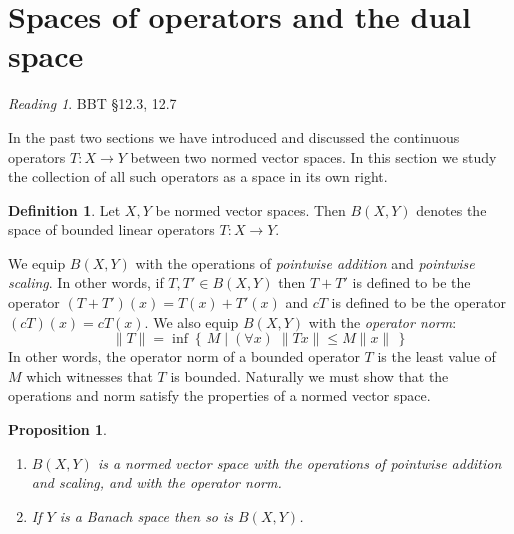 \documentclass[11pt,oneside]{amsbook}
\newcommand{\set}[1]{\left\{\,#1\,\right\}}
\theoremstyle{definition}
\theoremstyle{plain}
\newtheorem{prop}[thm]{Proposition}
\theoremstyle{definition}
\newtheorem{defn}[thm]{Definition}
\theoremstyle{remark}
\newtheorem*{reading}{Reading}
\numberwithin{equation}{section}
\numberwithin{figure}{section}
\begin{document}
\newpage
\section{Spaces of operators and the dual space}

\begin{reading}
  BBT \S 12.3, 12.7
\end{reading}

In the past two sections we have introduced and discussed the continuous operators $T\colon X\to Y$ between two normed vector spaces. In this section we study the collection of all such operators as a space in its own right.

\begin{defn}
  Let $X,Y$ be normed vector spaces. Then $B(X,Y)$ denotes the space of bounded linear operators $T\colon X\to Y$.
\end{defn}

We equip $B(X,Y)$ with the operations of \emph{pointwise addition} and \emph{pointwise scaling}. In other words, if $T,T'\in B(X,Y)$ then $T+T'$ is defined to be the operator $(T+T')(x)=T(x)+T'(x)$ and $cT$ is defined to be the operator $(cT)(x)=cT(x)$. We also equip $B(X,Y)$ with the \emph{operator norm}:
\[\|T\|=\inf\set{M\mid(\forall x)\;\|Tx\|\leq M\|x\|}
\]
In other words, the operator norm of a bounded operator $T$ is the least value of $M$ which witnesses that $T$ is bounded. Naturally we must show that the operations and norm satisfy the properties of a normed vector space.

\begin{prop}
  \begin{enumerate}
  \item $B(X,Y)$ is a normed vector space with the operations of pointwise addition and scaling, and with the operator norm.
  \item If $Y$ is a Banach space then so is $B(X,Y)$.
  \end{enumerate}
\end{prop}
\end{document}
